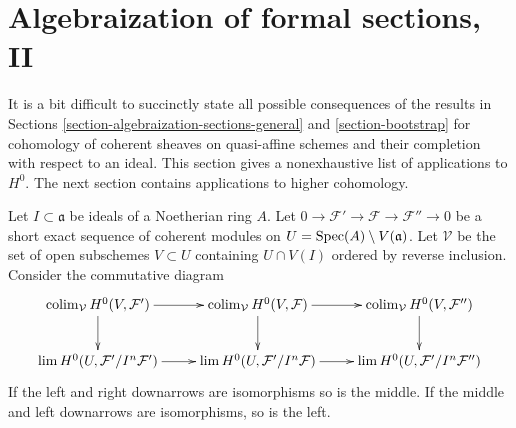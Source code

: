 \section{Algebraization of formal sections, II}
\label{section-algebraization-sections-coherent}

\noindent
It is a bit difficult to succinctly state all possible
consequences of the results in
Sections \ref{section-algebraization-sections-general} and
\ref{section-bootstrap}
for cohomology of coherent sheaves on quasi-affine schemes
and their completion with respect to an ideal.
This section gives a nonexhaustive list of
applications to $H^0$. The next section contains
applications to higher cohomology.

\begin{lemma}
\label{lemma-ses-H0}
Let $I \subset \mathfrak a$ be ideals of a Noetherian ring $A$.
Let $0 \to \mathcal{F}' \to \mathcal{F} \to \mathcal{F}'' \to 0$
be a short exact sequence of coherent modules on
$U = \mathop{\mathrm{Spec}}(A) \setminus V(\mathfrak a)$. Let $\mathcal{V}$
be the set of open subschemes $V \subset U$ containing
$U \cap V(I)$ ordered by reverse inclusion.
Consider the commutative diagram
$$
\xymatrix{
\colim_\mathcal{V} H^0(V, \mathcal{F}') \ar[d] \ar[r] &
\colim_\mathcal{V} H^0(V, \mathcal{F}) \ar[d] \ar[r] &
\colim_\mathcal{V} H^0(V, \mathcal{F}'') \ar[d] \\
\lim H^0(U, \mathcal{F}'/I^n\mathcal{F}') \ar[r] &
\lim H^0(U, \mathcal{F}'/I^n\mathcal{F}) \ar[r] &
\lim H^0(U, \mathcal{F}'/I^n\mathcal{F}'')
}
$$
If the left and right downarrows are isomorphisms so is the middle.
If the middle and left downarrows are isomorphisms, so is the left.
\end{lemma}

